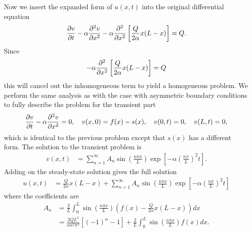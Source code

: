 Now we insert the expanded form of $u(x,t)$ into the original differential equation
\begin{align}
  \frac{ \partial {v} }{ \partial {t} } - \alpha \frac{ \partial^2 {v} }{ \partial {x}^2 } - \alpha \frac{ \partial^2 {} }{ \partial {x}^2 } \left[ \frac{ Q }{ 2 \alpha } x ( L - x ) \right] = Q .
\end{align}
Since
\begin{align}
  - \alpha \frac{ \partial^2 {} }{ \partial {x}^2 } \left[ \frac{ Q }{ 2 \alpha } x ( L - x ) \right] = Q \nonumber
\end{align}
this will cancel out the inhomogeneous term to yield a homogeneous problem. We perform the same analysis as with the case with asymmetric boundary conditions to fully describe the problem for the transient part
\begin{align}
  \frac{ \partial {v} }{ \partial {t} } - \alpha \frac{ \partial^2 {v} }{ \partial {x}^2 } = 0 , \quad v(x,0) = f(x) - s(x), \quad v(0,t) = 0, \quad v(L,t) = 0 ,
\end{align}
which is identical to the previous problem except that $s(x)$ has a different form. The solution to the transient problem is
\begin{align}
  v(x,t) &= \sum_{n=1}^\infty A_n \sin \left( \frac{ n \pi x }{ L } \right)  \exp \left[ -\alpha \left( \frac{ n \pi }{ L } \right)^2 t \right] .
\end{align}
Adding on the steady-state solution gives the full solution
\begin{align}
  u(x,t) &= \frac{ Q }{ 2 \alpha } x ( L - x ) + \sum_{n=1}^\infty A_n \sin \left( \frac{ n \pi x }{ L } \right)  \exp \left[ -\alpha \left( \frac{ n \pi }{ L } \right)^2 t \right] 
\end{align}
where the coefficients are
\begin{align}
  A_n &=  \frac{2}{L} \int_0^L \sin \left( \frac{ n \pi x }{ L } \right) \left( f(x) - \frac{ Q }{ 2 \alpha } x ( L - x ) \right) dx  \nonumber \\
      &= \frac{2 Q L^2 }{ \alpha n^3 \pi^3 } \left[ (-1)^n - 1 \right] + \frac{2}{L} \int_0^L \sin \left( \frac{ n \pi x }{ L } \right) f(x) dx .
\end{align}

